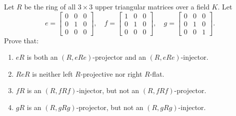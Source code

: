Let $R$ be the ring of all $3 \times 3$ upper triangular matrices over a field $K$. Let
$$e = \begin{bmatrix} 0 & 0 & 0 \\ 0 & 1 & 0 \\ 0 & 0 & 0 \end{bmatrix}, \quad
f = \begin{bmatrix} 1 & 0 & 0 \\ 0 & 1 & 0 \\ 0 & 0 & 0 \end{bmatrix}, \quad
g = \begin{bmatrix} 0 & 0 & 0 \\ 0 & 1 & 0 \\ 0 & 0 & 1 \end{bmatrix}.$$
Prove that:
\begin{enumerate}
    \item[(1)] $eR$ is both an $(R, eRe)$-projector and an $(R, eRe)$-injector.
    \item[(2)] $ReR$ is neither left $R$-projective nor right $R$-flat.
    \item[(3)] $fR$ is an $(R, fRf)$-injector, but not an $(R, fRf)$-projector.
    \item[(4)] $gR$ is an $(R, gRg)$-projector, but not an $(R, gRg)$-injector.
\end{enumerate}
